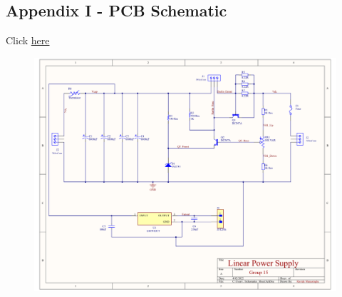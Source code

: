 \documentclass[11pt]{article}
\begin{document}
\subsection{Appendix I - PCB Schematic}
Click \textcolor{blue}{\hyperlink{page.8}{here}}
\begin{figure}
    \centering
    \includegraphics[width=1\textwidth]{schematic.pdf}
\end{figure}
\end{document}
